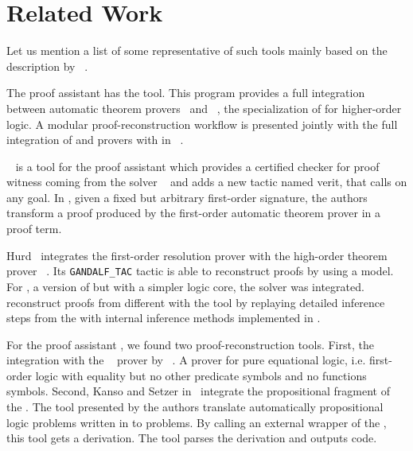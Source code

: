 \documentclass[../main.tex]{subfiles}
\begin{document}

\section{Related Work}
\label{sec:related-work}

Let us mention a list of some representative of such tools mainly based on the
description by \citeauthor{Sicard-Ramirez2016}~\cite{Sicard-Ramirez2016}.

The  proof assistant has the  tool.
This program provides a full integration between
automatic theorem provers~\cite{meng2006automation,blanchette2013extending,Fleury2014,hurlin07practical,bohme2010,blanchette2013extending} and
~\cite{nipkow2002isabelle}, the specialization of
 for higher-order logic.
A modular proof-reconstruction workflow is presented jointly with
the full integration of  and  provers with
 in \citeauthor{Een2004}~\cite{Een2004}.

~\cite{armand2011,Ekici2017} is a tool for the
 proof assistant \cite{coqteam} which provides a certified
checker for proof witness coming from the \SMT solver
~\cite{bouton2009} and adds a new tactic named verit,
that calls  on any  goal.
In \cite{Bezem2002},
given a fixed but arbitrary first-order signature, the authors
transform a proof produced by the first-order automatic theorem
prover  \cite{deNivelle2003} in a  proof
term.

Hurd~\cite{Hurd1999} integrates the first-order resolution prover
 with the high-order
theorem prover ~\cite{norrish2007hol}.
Its \verb!GANDALF_TAC! tactic is able to reconstruct  proofs
by using a  model. For , a version of
 but with a simpler logic core, the \SMT solver 
was integrated. \citeauthor{kaliszyk2013}~\cite{kaliszyk2013}
reconstruct proofs from different \ATPs with the  tool by
replaying detailed inference steps from the \ATPs with internal
inference methods implemented in .

For the proof assistant \Agda, we found two proof-reconstruction tools.
First, the integration with the ~\cite{hillenbrand1997}
prover by \citeauthor{foster2011integrating}~\cite{foster2011integrating}.
A prover for pure equational logic, i.e.
first-order logic with equality but no other predicate symbols and no
functions symbols.
Second, Kanso and Setzer in~\cite{kanso2016light} integrate the propositional
fragment of the . The tool presented by the authors
translate automatically propositional logic problems written in \Agda
to \TPTP problems. By calling an external wrapper of the \ATP, this
tool gets a \TSTP derivation. The tool parses the 
derivation and outputs \Agda code.
\end{document}
